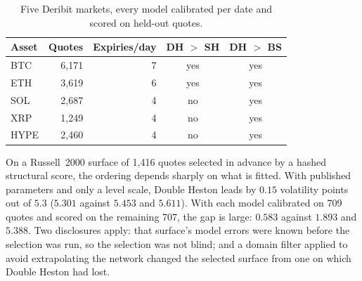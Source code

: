\documentclass[conference]{IEEEtran}
\begin{document}
\begin{table}[!t]
\centering
\caption{Five Deribit markets, every model calibrated per date and scored on
held-out quotes.}
\label{tab:crypto}
\begin{tabular}{lrrcc}
\toprule
Asset & Quotes & Expiries/day & DH $>$ SH & DH $>$ BS \\
\midrule
BTC & 6{,}171 & 7 & yes & yes \\
ETH & 3{,}619 & 6 & yes & yes \\
SOL & 2{,}687 & 4 & no & yes \\
XRP & 1{,}249 & 4 & no & yes \\
HYPE & 2{,}460 & 4 & no & yes \\
\bottomrule
\end{tabular}
\end{table}

On a Russell~2000 surface of 1,416 quotes selected in advance by a hashed
structural score, the ordering depends sharply on what is fitted. With
published parameters and only a level scale, Double Heston leads by $0.15$
volatility points out of $5.3$ ($5.301$ against $5.453$ and $5.611$). With each
model calibrated on 709 quotes and scored on the remaining 707, the gap is
large: $0.583$ against $1.893$ and $5.388$. Two disclosures apply: that
surface's model errors were known before the selection was run, so the
selection was not blind; and a domain filter applied to avoid extrapolating the
network changed the selected surface from one on which Double Heston had lost.
\end{document}
